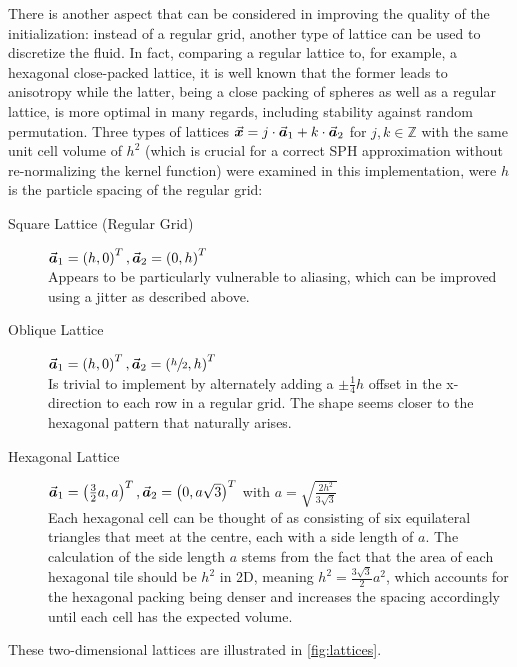 There is another aspect that can be considered in improving the quality of the initialization: instead of a regular grid, another type of lattice can be used to discretize the fluid. In fact, comparing a regular lattice to, for example, a hexagonal close-packed lattice, it is well known that the former leads to anisotropy while the latter, being a close packing of spheres as well as a regular lattice, is more optimal in many regards, including stability against random permutation\autocite*{initialization-lattices-optimal-initial}. Three types of lattices $\vec{\bm{x}} = j\cdot\vec{\bm{a}}_1 + k\cdot\vec{\bm{a}}_2$ for $j,k\in\mathds{Z}$ with the same unit cell volume of $h^2$ (which is crucial for a correct SPH approximation without re-normalizing the kernel function) were examined in this implementation, were $h$ is the particle spacing of the regular grid:
\begin{description}
  \item[Square Lattice (Regular Grid)] $\vec{\bm{a}}_1 = \left(h,0\right)^T, \vec{\bm{a}}_2 = \left(0,h\right)^T$\\
        Appears to be particularly vulnerable to aliasing, which can be improved using a jitter as described above.
  \item[Oblique Lattice] $\vec{\bm{a}}_1 = \left(h,0\right)^T, \vec{\bm{a}}_2 = \left(\sfrac{h}{2},h\right)^T$\\
        Is trivial to implement by alternately adding a $\pm\frac{1}{4}h$ offset in the x-direction to each row in a regular grid. The shape seems closer to the hexagonal pattern that naturally arises.
  \item[Hexagonal Lattice] $\vec{\bm{a}}_1 = \left(\frac{3}{2}a,a\right)^T, \vec{\bm{a}}_2 = \left(0,a\sqrt{3}\right)^T$ with $a = \sqrt{\frac{2h^2}{3\sqrt{3}}}$\\
        Each hexagonal cell can be thought of as consisting of six equilateral triangles that meet at the centre, each with a side length of $a$. The calculation of the side length $a$ stems from the fact that the area of each hexagonal tile should be $h^2$ in 2D, meaning $h^2 = \frac{3\sqrt{3}}{2}a^2$, which accounts for the hexagonal packing being denser and increases the spacing accordingly until each cell has the expected volume.
\end{description}
These two-dimensional lattices are illustrated in \autoref{fig:lattices}.

